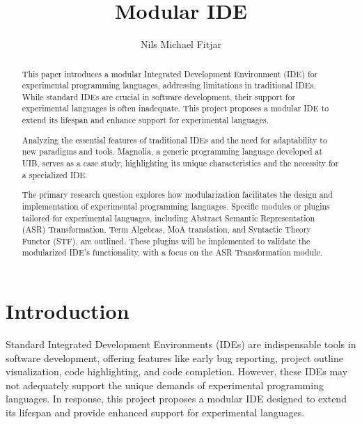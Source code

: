 \documentclass[runningheads]{llncs}
\begin{document}
\title{Modular IDE}

\author{Nils Michael Fitjar
}



\maketitle
\begin{abstract}
This paper introduces a modular Integrated Development Environment (IDE) for experimental programming languages, addressing limitations in traditional IDEs. While standard IDEs are crucial in software development, their support for experimental languages is often inadequate. This project proposes a modular IDE to extend its lifespan and enhance support for experimental languages.

Analyzing the essential features of traditional IDEs and the need for adaptability to new paradigms and tools. Magnolia, a generic programming language developed at UIB, serves as a case study, highlighting its unique characteristics and the necessity for a specialized IDE.

The primary research question explores how modularization facilitates the design and implementation of experimental programming languages. Specific modules or plugins tailored for experimental languages, including Abstract Semantic Representation (ASR) Transformation, Term Algebras, MoA translation, and Syntactic Theory Functor (STF), are outlined. These plugins will be implemented to validate the modularized IDE's functionality, with a focus on the ASR Transformation module.

\end{abstract} 

\section{Introduction}

Standard Integrated Development Environments (IDEs) are indispensable tools in software development,
offering features like early bug reporting, project outline visualization, code highlighting, and code completion. However, these IDEs may not adequately support the unique demands of experimental programming languages. In response, this project proposes a modular IDE designed to extend its lifespan and provide enhanced support for experimental languages.
\end{document}
